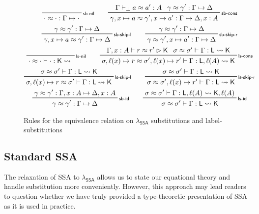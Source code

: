 \documentclass[acmsmall,screen,review]{acmart}
\newcommand{\ms}[1]{\ensuremath{\mathsf{#1}}}
\newcommand{\bhyp}[2]{#1 : #2}
\newcommand{\lhyp}[2]{#1(#2)}
\newcommand{\rle}[1]{{\scriptsize\textsf{#1}}}
\newcommand{\issubst}[3]{#1: #2 \mapsto #3}
\newcommand{\lbsubst}[4]{#1 \vdash #2: #3 \rightsquigarrow #4}
\newcommand{\teqv}{\approx}
\newcommand{\tmeq}[5]{#1 \vdash_{#2} #3 \teqv #4 : {#5}}
\newcommand{\lbeq}[4]{#1 \vdash #2 \teqv #3 \rhd {#4}}
\newcommand{\tmseq}[4]{\issubst{#1 \teqv #2}{#3}{#4}}
\newcommand{\lbseq}[5]{\lbsubst{#1 \teqv #2}{#3}{#4}{#5}}
\newcommand{\isotopessa}{\(\lambda_{\ms{SSA}}\)}
\begin{document}
\begin{figure}
  \begin{gather*}
    \prftree[r]{\rle{sb-nil}}{\tmseq{\cdot}{\cdot}{\Gamma}{\cdot}} \qquad
    \prftree[r]{\rle{sb-cons}}
      {\tmeq{\Gamma}{\bot}{a}{a'}{A}}{\tmseq{\gamma}{\gamma'}{\Gamma}{\Delta}}
      {\tmseq{\gamma, x \mapsto a}{\gamma', x \mapsto a'}{\Gamma}{\Delta, \bhyp{x}{A}}}
    \\
    \prftree[r]{\rle{sb-skip-l}}
      {\tmseq{\gamma}{\gamma'}{\Gamma}{\Delta}}
      {\tmseq{\gamma, x \mapsto a}{\gamma'}{\Gamma}{\Delta}} \qquad
    \prftree[r]{\rle{sb-skip-r}}
      {\tmseq{\gamma}{\gamma'}{\Gamma}{\Delta}}
      {\tmseq{\gamma}{\gamma', x \mapsto a'}{\Gamma}{\Delta}}
    \\
    \prftree[r]{\rle{ls-nil}}{\lbseq{\cdot}{\cdot}{\cdot}{\ms{K}}} \qquad
    \prftree[r]{\rle{ls-cons}}
      {\lbeq{\Gamma, \bhyp{x}{A}}{r}{r'}{\ms{K}}}
      {\lbseq{\sigma}{\sigma'}{\Gamma}{\ms{L}}{\ms{K}}}
      {\lbseq
        {\sigma, \ell(x) \mapsto r}{\sigma', \ell(x) \mapsto r'}{\Gamma}
        {\ms{L}, \ell(A)}{\ms{K}}}
    \\
    \prftree[r]{\rle{ls-skip-l}}
      {\lbseq{\sigma}{\sigma'}{\Gamma}{\ms{L}}{\ms{K}}}
      {\lbseq{\sigma, \ell(x) \mapsto r}{\sigma'}{\Gamma}{\ms{L}}{\ms{K}}}
      \qquad
    \prftree[r]{\rle{ls-skip-r}}
      {\lbseq{\sigma}{\sigma'}{\Gamma}{\ms{L}}{\ms{K}}}
      {\lbseq{\sigma}{\sigma', \ell(x) \mapsto r'}{\Gamma}{\ms{L}}{\ms{K}}}
    \\
    \prftree[r]{\rle{sb-id}}
      {\tmseq{\gamma}{\gamma'}{\Gamma, \bhyp{x}{A}}{\Delta, \bhyp{x}{A}}}
      {\tmseq{\gamma}{\gamma'}{\Gamma}{\Delta}} \qquad
    \prftree[r]{\rle{ls-id}}
      {\lbseq{\sigma}{\sigma'}{\Gamma}{\ms{L}, \lhyp{\ell}{A}}{\ms{K}, \lhyp{\ell}{A}}}
      {\lbseq{\sigma}{\sigma'}{\Gamma}{\ms{L}}{\ms{K}}}
  \end{gather*}
  \Description{}
  \caption{Rules for the equivalence relation on \isotopessa{} substitutions and label-substitutions}
  \label{fig:ssa-subst-equiv}
\end{figure}

\subsection{Standard SSA}

\label{ssec:ssa-normal}

The relaxation of SSA to \isotopessa{} allows us to state our equational theory and handle
substitution more conveniently. However, this approach may lead readers to question whether we have
truly provided a type-theoretic presentation of SSA as it is used in practice. 
\end{document}
